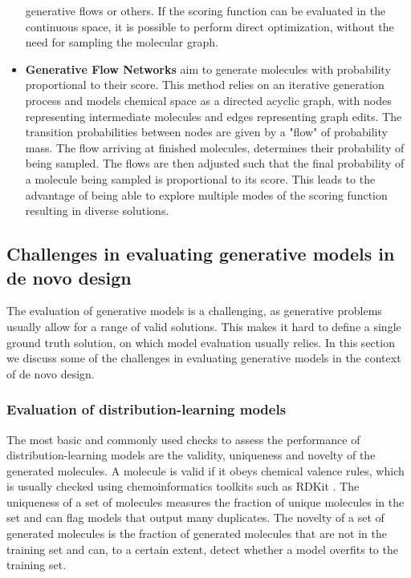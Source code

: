 \begin{itemize}
          generative flows \citep{madhawaGraphNVPInvertibleFlow2019} or others. If the scoring
          function can be evaluated in the continuous space, it is possible to perform direct
          optimization, without the need for sampling the molecular graph.
    \item \textbf{Generative Flow Networks} \citep{bengioFlowNetworkBased2021} aim to generate
          molecules with probability proportional to their score. This method relies on an
          iterative generation process and models chemical space as a directed acyclic graph, with
          nodes representing intermediate molecules and edges representing graph edits. The transition
          probabilities between nodes are given by a "flow" of probability mass. The flow arriving
          at finished molecules, determines their probability of being sampled. The flows are
          then adjusted such that the final probability of a molecule being sampled is
          proportional to its score. This leads to the advantage of being able to explore multiple
          modes of the scoring function resulting in diverse solutions.
\end{itemize}

\subsection{Challenges in evaluating generative models in de novo design}

The evaluation of generative models is a challenging, as generative problems usually allow for a
range of valid solutions. This makes it hard to define a single ground truth solution, on which model
evaluation usually relies. In this section we discuss some of the challenges in evaluating
generative models in the context of de novo design.

\subsubsection{Evaluation of distribution-learning models}
The most basic and commonly used checks to assess the performance of distribution-learning models
are the validity, uniqueness and novelty of the generated molecules. A molecule is valid if it obeys
chemical valence rules, which is usually checked using chemoinformatics toolkits such as RDKit
\citep{landrumRDKitOpensourceCheminformatics2006}. The uniqueness of a set of molecules measures the
fraction of unique molecules in the set and can flag models that output many duplicates. The novelty
of a set of generated molecules is the fraction of generated molecules that are not in the training
set and can, to a certain extent, detect whether a model overfits to the training set.

